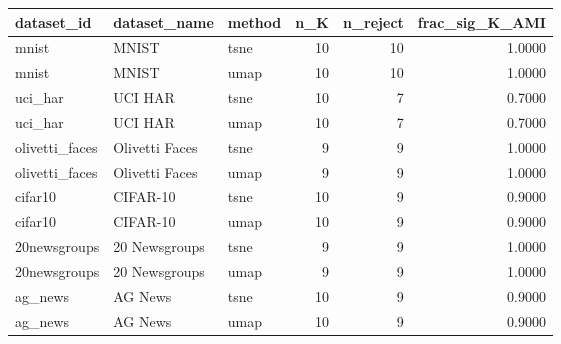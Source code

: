 \begin{tabular}{lllrrr}
\toprule
dataset_id & dataset_name & method & n_K & n_reject & frac_sig_K_AMI \\
\midrule
mnist & MNIST & tsne & 10 & 10 & 1.0000 \\
mnist & MNIST & umap & 10 & 10 & 1.0000 \\
uci_har & UCI HAR & tsne & 10 & 7 & 0.7000 \\
uci_har & UCI HAR & umap & 10 & 7 & 0.7000 \\
olivetti_faces & Olivetti Faces & tsne & 9 & 9 & 1.0000 \\
olivetti_faces & Olivetti Faces & umap & 9 & 9 & 1.0000 \\
cifar10 & CIFAR-10 & tsne & 10 & 9 & 0.9000 \\
cifar10 & CIFAR-10 & umap & 10 & 9 & 0.9000 \\
20newsgroups & 20 Newsgroups & tsne & 9 & 9 & 1.0000 \\
20newsgroups & 20 Newsgroups & umap & 9 & 9 & 1.0000 \\
ag_news & AG News & tsne & 10 & 9 & 0.9000 \\
ag_news & AG News & umap & 10 & 9 & 0.9000 \\
\bottomrule
\end{tabular}
